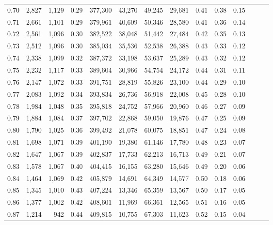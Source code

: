 \begin{tabular}{rrrrrrrrrrrrrr}
0.70 &   2,827 &  1,129 &  0.29 &  377,300 &   43,270 &  49,245 &  29,681 &  0.41 &  0.38 &      0.15 \\
0.71 &   2,661 &  1,101 &  0.29 &  379,961 &   40,609 &  50,346 &  28,580 &  0.41 &  0.36 &      0.14 \\
0.72 &   2,561 &  1,096 &  0.30 &  382,522 &   38,048 &  51,442 &  27,484 &  0.42 &  0.35 &      0.13 \\
0.73 &   2,512 &  1,096 &  0.30 &  385,034 &   35,536 &  52,538 &  26,388 &  0.43 &  0.33 &      0.12 \\
0.74 &   2,338 &  1,099 &  0.32 &  387,372 &   33,198 &  53,637 &  25,289 &  0.43 &  0.32 &      0.12 \\
0.75 &   2,232 &  1,117 &  0.33 &  389,604 &   30,966 &  54,754 &  24,172 &  0.44 &  0.31 &      0.11 \\
0.76 &   2,147 &  1,072 &  0.33 &  391,751 &   28,819 &  55,826 &  23,100 &  0.44 &  0.29 &      0.10 \\
0.77 &   2,083 &  1,092 &  0.34 &  393,834 &   26,736 &  56,918 &  22,008 &  0.45 &  0.28 &      0.10 \\
0.78 &   1,984 &  1,048 &  0.35 &  395,818 &   24,752 &  57,966 &  20,960 &  0.46 &  0.27 &      0.09 \\
0.79 &   1,884 &  1,084 &  0.37 &  397,702 &   22,868 &  59,050 &  19,876 &  0.47 &  0.25 &      0.09 \\
0.80 &   1,790 &  1,025 &  0.36 &  399,492 &   21,078 &  60,075 &  18,851 &  0.47 &  0.24 &      0.08 \\
0.81 &   1,698 &  1,071 &  0.39 &  401,190 &   19,380 &  61,146 &  17,780 &  0.48 &  0.23 &      0.07 \\
0.82 &   1,647 &  1,067 &  0.39 &  402,837 &   17,733 &  62,213 &  16,713 &  0.49 &  0.21 &      0.07 \\
0.83 &   1,578 &  1,067 &  0.40 &  404,415 &   16,155 &  63,280 &  15,646 &  0.49 &  0.20 &      0.06 \\
0.84 &   1,464 &  1,069 &  0.42 &  405,879 &   14,691 &  64,349 &  14,577 &  0.50 &  0.18 &      0.06 \\
0.85 &   1,345 &  1,010 &  0.43 &  407,224 &   13,346 &  65,359 &  13,567 &  0.50 &  0.17 &      0.05 \\
0.86 &   1,377 &  1,002 &  0.42 &  408,601 &   11,969 &  66,361 &  12,565 &  0.51 &  0.16 &      0.05 \\
0.87 &   1,214 &    942 &  0.44 &  409,815 &   10,755 &  67,303 &  11,623 &  0.52 &  0.15 &      0.04 \\

\end{tabular}
